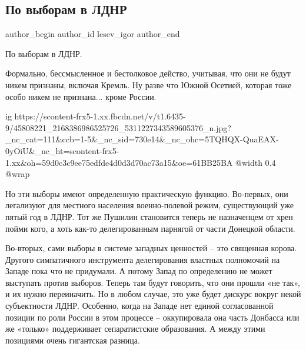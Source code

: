  
 
 
 
 
 
\subsection{По выборам в ЛДНР}
\label{sec:11_11_2018.fb.lesev_igor.1.po_vyboram_v_ldnr}
 
\ifcmt
 author_begin
   author_id lesev_igor
 author_end
\fi

По выборам в ЛДНР.

Формально, бессмысленное и бестолковое действо, учитывая, что они не будут
никем признаны, включая Кремль. Ну разве что Южной Осетией, которая тоже особо
никем не признана... кроме России.

\ifcmt
  ig https://scontent-frx5-1.xx.fbcdn.net/v/t1.6435-9/45808221_2168386986525726_5311227343589605376_n.jpg?_nc_cat=111&ccb=1-5&_nc_sid=730e14&_nc_ohc=5TQHQX-QuaEAX-0yOiU&_nc_ht=scontent-frx5-1.xx&oh=59d0c3c9ee75edfde4d0d3d70ac73a15&oe=61BB25BA
  @width 0.4
  @wrap 
\fi

Но эти выборы имеют определенную практическую функцию. Во-первых, они
легализуют для местного населения военно-полевой режим, существующий уже пятый
год в ЛДНР. Тот же Пушилин становится теперь не назначенцем от хрен пойми кого,
а хоть как-то делегированным парнягой от части Донецкой области.

Во-вторых, сами выборы в системе западных ценностей – это священная корова.
Другого симпатичного инструмента делегирования властных полномочий на Западе
пока что не придумали. А потому Запад по определению не может выступать против
выборов. Теперь там будут говорить, что они прошли «не так», и их нужно
переиначить. Но в любом случае, это уже будет дискурс вокруг некой субъектности
ЛДНР. Особенно, когда на Западе нет единой согласованной позиции по роли России
в этом процессе – оккупировала она часть Донбасса или же «только» поддерживает
сепаратистские образования. А между этими позициями очень гигантская разница.

